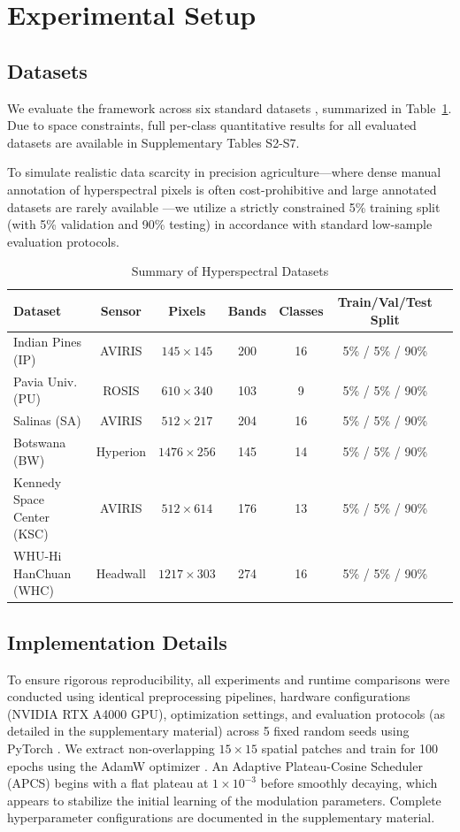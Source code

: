 \documentclass[pdflatex,sn-mathphys-num]{sn-jnl}
\theoremstyle{thmstyleone}
\theoremstyle{thmstyletwo}
\theoremstyle{thmstylethree}
\begin{document}
\section{Experimental Setup}
\subsection{Datasets}
We evaluate the framework across six standard datasets \cite{baumgardner2015indian,gamba2004pavia,gic2020hyperspectral,zhong2020whu}, summarized in Table~\ref{tab:datasets}. Due to space constraints, full per-class quantitative results for all evaluated datasets are available in Supplementary Tables S2-S7.

To simulate realistic data scarcity in precision agriculture---where dense manual annotation of hyperspectral pixels is often cost-prohibitive and large annotated datasets are rarely available \cite{gic2020hyperspectral}---we utilize a strictly constrained 5\% training split (with 5\% validation and 90\% testing) in accordance with standard low-sample evaluation protocols.
\begin{table}[!t]
\caption{Summary of Hyperspectral Datasets}
\label{tab:datasets}
\centering
\begin{tabular}{lcccccc}
\toprule
\textbf{Dataset} & \textbf{Sensor} & \textbf{Pixels} & \textbf{Bands} & \textbf{Classes} & \textbf{Train/Val/Test Split} \\
\midrule
Indian Pines (IP) & AVIRIS & $145 \times 145$ & 200 & 16 & 5\% / 5\% / 90\% \\
Pavia Univ. (PU) & ROSIS & $610 \times 340$ & 103 & 9 & 5\% / 5\% / 90\% \\
Salinas (SA) & AVIRIS & $512 \times 217$ & 204 & 16 & 5\% / 5\% / 90\% \\
Botswana (BW) & Hyperion & $1476 \times 256$ & 145 & 14 & 5\% / 5\% / 90\% \\
Kennedy Space Center (KSC) & AVIRIS & $512 \times 614$ & 176 & 13 & 5\% / 5\% / 90\% \\
WHU-Hi HanChuan (WHC) & Headwall & $1217 \times 303$ & 274 & 16 & 5\% / 5\% / 90\% \\
\bottomrule
\end{tabular}
\end{table}

\subsection{Implementation Details}
To ensure rigorous reproducibility, all experiments and runtime comparisons were conducted using identical preprocessing pipelines, hardware configurations (NVIDIA RTX A4000 GPU), optimization settings, and evaluation protocols (as detailed in the supplementary material) across 5 fixed random seeds using PyTorch \cite{paszke2019pytorch}. We extract non-overlapping $15 \times 15$ spatial patches and train for 100 epochs using the AdamW optimizer \cite{loshchilov2019decoupled}. An Adaptive Plateau-Cosine Scheduler (APCS) begins with a flat plateau at $1 \times 10^{-3}$ before smoothly decaying, which appears to stabilize the initial learning of the modulation parameters. Complete hyperparameter configurations are documented in the supplementary material.
\end{document}
